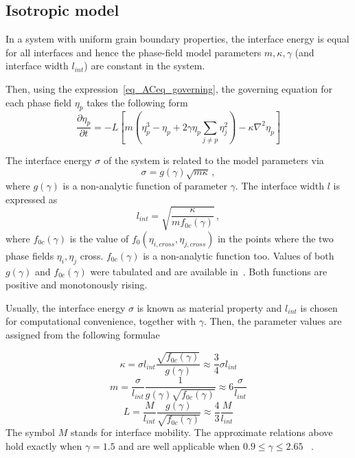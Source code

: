 	\subsection{Isotropic model}
	\label{sec_Models}
	In a system with uniform grain boundary properties, the interface energy is equal for all interfaces and hence the phase-field model parameters $m,\kappa, \gamma$ (and interface width $l_{int}$) are constant in the system.
	
	Then, using the expression~\eqref{eq_ACeq_governing}, the governing equation for each phase field $\eta_p$ takes the following form %
	\begin{equation}
		\frac{\partial \eta_p}{\partial t} = -L\left[ m\left( \eta_p^3-\eta_p +  2\gamma\eta_p\sum_{j\neq p}\eta_j^2 \right) - \kappa\nabla^2\eta_p \right] 
	\end{equation}
	
	The interface energy $\sigma$ of the system is related to the model parameters via 
	\begin{equation}\label{eq_IE}
		\sigma = g(\gamma)\sqrt{m\kappa} \,,
	\end{equation}
	where $g(\gamma)$ is a non-analytic function of parameter $\gamma$. The interface width $l$ is expressed as
	\begin{equation} \label{eq_IW}
		l_{int} = \sqrt{\frac{\kappa}{mf_{0c}(\gamma)}} \,,
	\end{equation}
	where $f_{0c}(\gamma)$ is the value of $f_0(\eta_{i,cross},\eta_{j,cross})$ in the points where the two phase fields $\eta_i,\eta_j$ cross. $f_{0c}(\gamma)$ is a non-analytic function too. Values of both $g(\gamma)$ and $f_{0c}(\gamma)$ were tabulated and are available in~\cite{Ravash2017}. Both functions are positive and monotonously rising.
	
	Usually, the interface energy $\sigma$ is known as material property and $l_{int}$ is chosen for computational convenience, together with $\gamma$. Then, the parameter values are assigned from the following formulae
	
	\begin{equation}\label{eq_def_kappa}
		\kappa = \sigma l_{int}\frac{\sqrt{f_{0c}(\gamma)}}{g(\gamma)} \approx \frac{3}{4}\sigma l_{int}
	\end{equation}
	\begin{equation} \label{eq_def_m}
		m = \frac{\sigma}{l_{int}}\frac{1}{g(\gamma)\sqrt{f_{0c}(\gamma)}} \approx 6 \frac{\sigma}{l_{int}}
	\end{equation}
	\begin{equation}\label{eq_def_L}
		L = \frac{M}{l_{int}}\frac{g(\gamma)}{\sqrt{f_{0c}(\gamma)}} \approx \frac{4}{3} \frac{M}{l_{int}}
	\end{equation}
	The symbol $M$ stands for interface mobility. The approximate relations above hold exactly when $\gamma=1.5$ and are well applicable when $0.9 \leq \gamma \leq 2.65$ ~\cite{Moelans2008}. 
	
